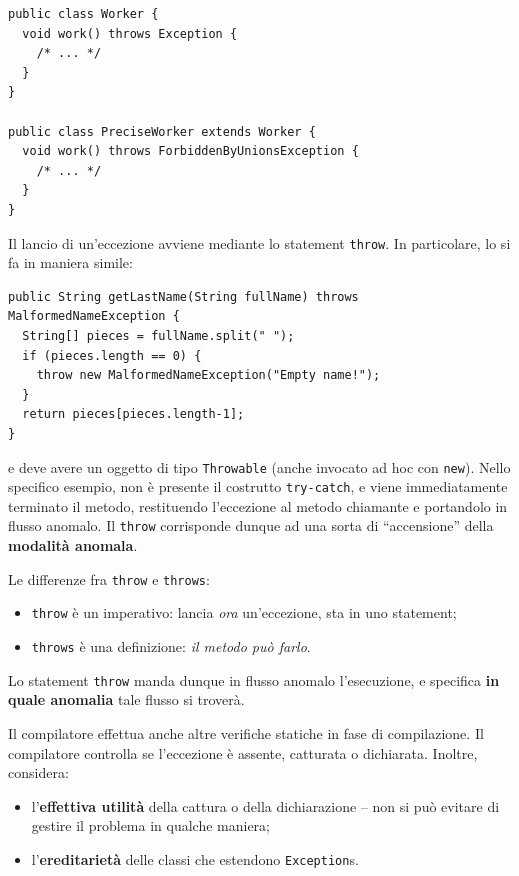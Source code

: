 \documentclass[\fontsizeclass,twocolumn]{\classname}
\theoremstyle{definition}
\theoremstyle{definition}
\begin{document}
\begin{lstlisting}
public class Worker {
  void work() throws Exception {
    /* ... */
  }
}

public class PreciseWorker extends Worker {
  void work() throws ForbiddenByUnionsException {
    /* ... */
  }
}
\end{lstlisting}

Il lancio di un'eccezione avviene mediante lo statement \texttt{throw}. In
particolare, lo si fa in maniera simile:

\begin{lstlisting}
public String getLastName(String fullName) throws MalformedNameException {
  String[] pieces = fullName.split(" ");
  if (pieces.length == 0) {
    throw new MalformedNameException("Empty name!");
  }
  return pieces[pieces.length-1];
}
\end{lstlisting}

e deve avere un oggetto di tipo \texttt{Throwable} (anche invocato ad hoc con
\texttt{new}). Nello specifico esempio, non è presente il costrutto
\texttt{try\--catch}, e viene immediatamente terminato il metodo, restituendo
l'eccezione al metodo chiamante e portandolo in flusso anomalo. Il
\texttt{throw} corrisponde dunque ad una sorta di ``accensione'' della
\textbf{modalità anomala}.

Le differenze fra \texttt{throw} e \texttt{throws}:
\begin{itemize}
    \item \texttt{throw} è un imperativo: lancia \emph{ora} un'eccezione, sta
        in uno statement;
    \item \texttt{throws} è una definizione: \emph{il metodo può farlo}.
\end{itemize}

Lo statement \texttt{throw} manda dunque in flusso anomalo l'esecuzione, e
specifica \textbf{in quale anomalia} tale flusso si troverà.

Il compilatore effettua anche altre verifiche statiche in fase di compilazione.
Il compilatore controlla se l'eccezione è assente, catturata o dichiarata.
Inoltre, considera:
\begin{itemize}
    \item l'\textbf{effettiva utilità} della cattura o della dichiarazione --
        non si può evitare di gestire il problema in qualche maniera;
    \item l'\textbf{ereditarietà} delle classi che estendono
        \texttt{Exception}s.
\end{itemize}
\end{document}
